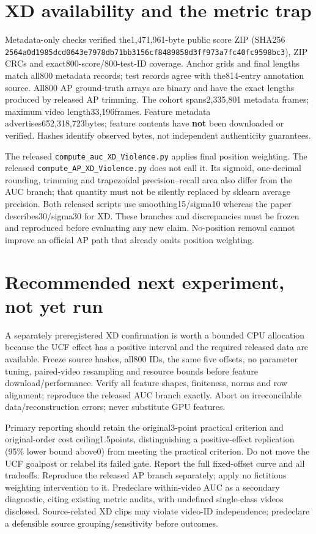 \documentclass[10pt]{article}
\begin{document}
\section{XD availability and the metric trap}
Metadata-only checks verified the1,471,961-byte public score ZIP (SHA256 \texttt{2564a0d1985dcd0643e7978db71bb3156cf8489858d3ff973a7fc40fc9598bc3}), ZIP CRCs and exact800-score/800-test-ID coverage. Anchor grids and final lengths match all800 metadata records; test records agree with the814-entry annotation source. All800 AP ground-truth arrays are binary and have the exact lengths produced by released AP trimming. The cohort spans2,335,801 metadata frames; maximum video length33,196frames. Feature metadata advertises652,318,723bytes; feature contents have \textbf{not} been downloaded or verified. Hashes identify observed bytes, not independent authenticity guarantees.

The released \texttt{compute\_auc\_XD\_Violence.py} applies final position weighting. The released \texttt{compute\_AP\_XD\_Violence.py} does not call it. Its sigmoid, one-decimal rounding, trimming and trapezoidal precision--recall area also differ from the AUC branch; that quantity must not be silently replaced by sklearn average precision. Both released scripts use smoothing15/sigma10 whereas the paper describes30/sigma30 for XD. These branches and discrepancies must be frozen and reproduced before evaluating any new claim. No-position removal cannot improve an official AP path that already omits position weighting.

\section{Recommended next experiment, not yet run}
A separately preregistered XD confirmation is worth a bounded CPU allocation because the UCF effect has a positive interval and the required released data are available. Freeze source hashes, all800 IDs, the same five offsets, no parameter tuning, paired-video resampling and resource bounds before feature download/performance. Verify all feature shapes, finiteness, norms and row alignment; reproduce the released AUC branch exactly. Abort on irreconcilable data/reconstruction errors; never substitute GPU features.

Primary reporting should retain the original3-point practical criterion and original-order cost ceiling1.5points, distinguishing a positive-effect replication (95\% lower bound above0) from meeting the practical criterion. Do not move the UCF goalpost or relabel its failed gate. Report the full fixed-offset curve and all tradeoffs. Reproduce the released AP branch separately; apply no fictitious weighting intervention to it. Predeclare within-video AUC as a secondary diagnostic, citing existing metric audits, with undefined single-class videos disclosed. Source-related XD clips may violate video-ID independence; predeclare a defensible source grouping/sensitivity before outcomes.
\end{document}
